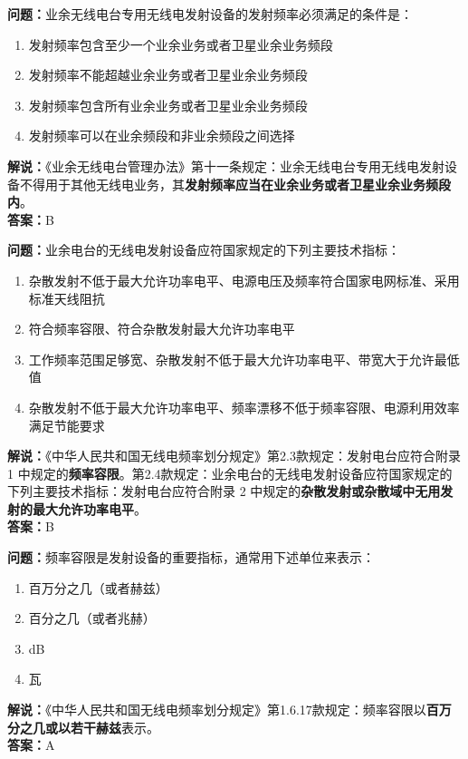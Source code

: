 \documentclass{ctexbook}
\begin{document}
\bigskip


\noindent\textbf{问题：}业余无线电台专用无线电发射设备的发射频率必须满足的条件是：
\begin{enumerate}[label=\Alph*), leftmargin=3em]
	\item 发射频率包含至少一个业余业务或者卫星业余业务频段
	\item 发射频率不能超越业余业务或者卫星业余业务频段
	\item 发射频率包含所有业余业务或者卫星业余业务频段
	\item 发射频率可以在业余频段和非业余频段之间选择
\end{enumerate}
\noindent\textbf{解说：}《业余无线电台管理办法》第十一条规定：业余无线电台专用无线电发射设备不得用于其他无线电业务，其\textbf{发射频率应当在业余业务或者卫星业余业务频段内}。\\\noindent\textbf{答案：}B


\bigskip


\noindent\textbf{问题：}业余电台的无线电发射设备应符国家规定的下列主要技术指标：
\begin{enumerate}[label=\Alph*), leftmargin=3em]
	\item 杂散发射不低于最大允许功率电平、电源电压及频率符合国家电网标准、采用标准天线阻抗
	\item 符合频率容限、符合杂散发射最大允许功率电平
	\item 工作频率范围足够宽、杂散发射不低于最大允许功率电平、带宽大于允许最低值
	\item 杂散发射不低于最大允许功率电平、频率漂移不低于频率容限、电源利用效率满足节能要求
\end{enumerate}
\noindent\textbf{解说：}《中华人民共和国无线电频率划分规定》第2.3款规定：发射电台应符合附录 1 中规定的\textbf{频率容限}。第2.4款规定：业余电台的无线电发射设备应符国家规定的下列主要技术指标：发射电台应符合附录 2 中规定的\textbf{杂散发射或杂散域中无用发射的最大允许功率电平}。\\\noindent\textbf{答案：}B



\bigskip


\noindent\textbf{问题：}频率容限是发射设备的重要指标，通常用下述单位来表示：
\begin{enumerate}[label=\Alph*), leftmargin=3em]
	\item 百万分之几（或者赫兹）
	\item 百分之几（或者兆赫）
	\item dB
	\item 瓦
\end{enumerate}
\noindent\textbf{解说：}《中华人民共和国无线电频率划分规定》第1.6.17款规定：频率容限以\textbf{百万分之几或以若干赫兹}表示。\\\noindent\textbf{答案：}A
\end{document}
